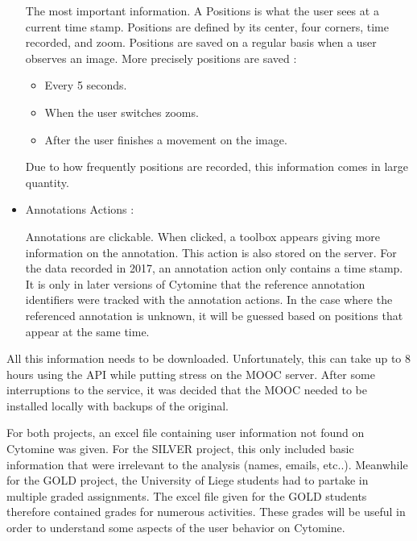\documentclass[a4paper,11pt]{report}
\numberwithin{figure}{section} %
\begin{document}
\begin{itemize}
         The most important information.
         A Positions is what the user sees at a current time stamp.
         Positions are defined by its center, four corners, time recorded, and zoom.
         Positions are saved on a regular basis when a user observes an image.
         More precisely positions are saved :
         \begin{itemize}
         	\item[\textbullet] Every 5 seconds.
            \item[\textbullet] When the user switches zooms.
            \item[\textbullet] After the user finishes a movement on the image.
         \end{itemize}
         Due to how frequently positions are recorded, this information comes in large quantity.
        \\
        \item[\textbullet] Annotations Actions :\newline
        
        Annotations are clickable.
        When clicked, a toolbox appears giving more information on the annotation.
        This action is also stored on the server.
        For the data recorded in 2017, an annotation action only contains a time stamp.
        It is only in later versions of Cytomine that the reference annotation identifiers were tracked with the annotation actions.
        In the case where the referenced annotation is unknown, it will be guessed based on positions that appear at the same time.
        
         \end{itemize}
	
        
		All this information needs to be downloaded.
		Unfortunately, this can take up to 8 hours using the API while putting stress on the MOOC server.
		After some interruptions to the service, it was decided that the MOOC needed to be installed locally with backups of the original. \newline
        
        For both projects, an excel file containing user information not found on Cytomine was given.
        For the SILVER project, this only included basic information that were irrelevant to the analysis (names, emails, etc..).
        Meanwhile for the GOLD project, the University of Liege students had to partake in multiple graded assignments.
        The excel file given for the GOLD students therefore contained grades for numerous activities.
        These grades will be useful in order to understand some aspects of the user behavior on Cytomine. \newline
        
\end{document}
